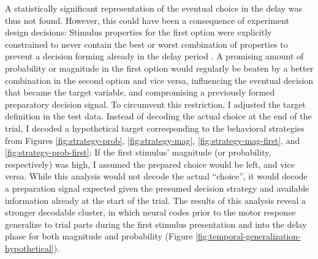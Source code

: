 A statistically significant representation of the eventual choice in the delay was thus not found.
However, this could have been a consequence of experiment design decisions:
Stimulus properties for the first option were explicitly constrained to never contain the best or worst combination of properties to prevent a decision forming already in the delay period \citep{curtis2010beyond}.
A promising amount of probability or magnitude in the first option would regularly be beaten by a better combination in the second option and vice versa, influencing the eventual decision that became the target variable, and compromising a previously formed preparatory decision signal.
To circumvent this restriction, I adjusted the target definition in the test data.
Instead of decoding the actual choice at the end of the trial, I decoded a hypothetical target corresponding to the behavioral strategies from Figures \ref{fig:strategy-prob},  \ref{fig:strategy-mag}, \ref{fig:strategy-mag-first}, and \ref{fig:strategy-prob-first}:
If the first stimulus' magnitude (or probability, respectively) was high, I assumed the prepared choice would be left, and vice versa.
While this analysis would not decode the actual ``choice'', it would decode a preparation signal expected given the presumed decision strategy and available information already at the start of the trial.
The results of this analysis reveal a stronger decodable cluster, in which neural codes prior to the motor response generalize to trial parts during the first stimulus presentation and into the delay phase for both magnitude and probability (Figure \ref{fig:temporal-generalization-hypothetical}). \\

